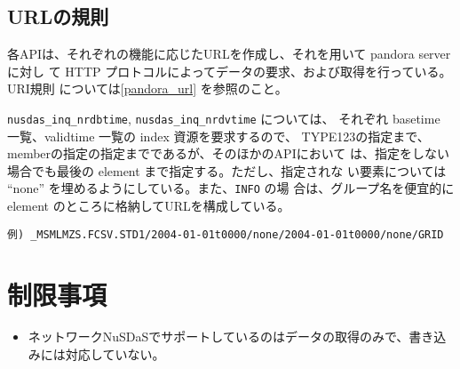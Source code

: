 \subsection{URLの規則}
各APIは、それぞれの機能に応じたURLを作成し、それを用いて pandora server に対し
て HTTP プロトコルによってデータの要求、および取得を行っている。URI規則
については\ref{pandora_url} を参照のこと。

{\tt nusdas\_inq\_nrdbtime}, {\tt nusdas\_inq\_nrdvtime} については、
それぞれ basetime 一覧、validtime 一覧の index 資源を要求するので、
TYPE123の指定まで、memberの指定の指定までであるが、そのほかのAPIにおいて
は、指定をしない場合でも最後の element まで指定する。ただし、指定されな
い要素については ``none'' を埋めるようにしている。また、{\tt INFO} の場
合は、グループ名を便宜的に element のところに格納してURLを構成している。

\begin{verbatim}
例) _MSMLMZS.FCSV.STD1/2004-01-01t0000/none/2004-01-01t0000/none/GRID
\end{verbatim}

\section{制限事項}
\begin{itemize}
\item ネットワークNuSDaSでサポートしているのはデータの取得のみで、書き込
      みには対応していない。
\end{itemize}
